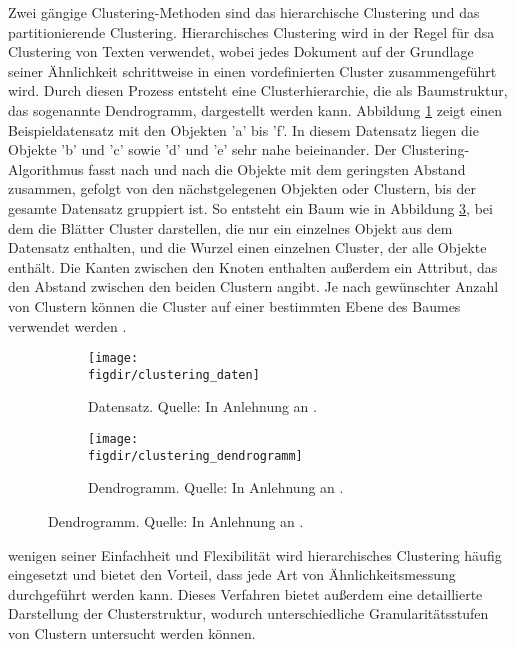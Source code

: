 Zwei gängige Clustering-Methoden sind das hierarchische Clustering und das partitionierende Clustering. Hierarchisches Clustering wird in der Regel für dsa Clustering von Texten verwendet, wobei jedes Dokument auf der Grundlage seiner Ähnlichkeit schrittweise in einen vordefinierten Cluster zusammengeführt wird. Durch diesen Prozess entsteht eine Clusterhierarchie, die als Baumstruktur, das sogenannte Dendrogramm, dargestellt werden kann. Abbildung \ref{f:clustering_daten} zeigt einen Beispieldatensatz mit den Objekten 'a' bis 'f'. In diesem Datensatz liegen die Objekte 'b' und 'c' sowie 'd' und 'e' sehr nahe beieinander. Der Clustering-Algorithmus fasst nach und nach die Objekte mit dem geringsten Abstand zusammen, gefolgt von den nächstgelegenen Objekten oder Clustern, bis der gesamte Datensatz gruppiert ist. So entsteht ein Baum wie in Abbildung \ref{f:clustering_baum}, bei dem die Blätter Cluster darstellen, die nur ein einzelnes Objekt aus dem Datensatz enthalten, und die Wurzel einen einzelnen Cluster, der alle Objekte enthält. Die Kanten zwischen den Knoten enthalten außerdem ein Attribut, das den Abstand zwischen den beiden Clustern angibt. Je nach gewünschter Anzahl von Clustern können die Cluster auf einer bestimmten Ebene des Baumes verwendet werden \cite{Suyal.2014}.

\begin{figure}[htbp]
    \centering
    \begin{subfigure}[b]{0.47\linewidth}
        \texttt{[image: \\figdir/clustering\_daten]}
        \caption{Datensatz. Quelle: In Anlehnung an \cite{Bonthu.2023}.}
        \label{f:clustering_daten}
    \end{subfigure}
    \hfill
    \begin{subfigure}[b]{0.47\linewidth}
        \texttt{[image: \\figdir/clustering\_dendrogramm]}
        \caption{Dendrogramm. Quelle: In Anlehnung an \cite{Bonthu.2023}.}
        \label{f:clustering_baum}
    \end{subfigure}
\end{figure}

wenigen seiner Einfachheit und Flexibilität wird hierarchisches Clustering häufig eingesetzt und bietet den Vorteil, dass jede Art von Ähnlichkeitsmessung durchgeführt werden kann. Dieses Verfahren bietet außerdem eine detaillierte Darstellung der Clusterstruktur, wodurch unterschiedliche Granularitätsstufen von Clustern untersucht werden können.

